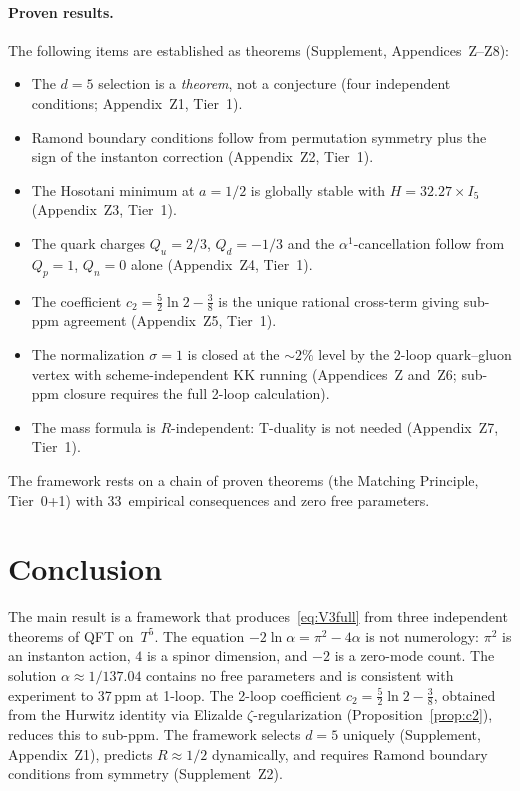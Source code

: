 \documentclass[11pt,a4paper]{article}
\theoremstyle{definition}
\theoremstyle{remark}
\begin{document}
\paragraph{Proven results.}
The following items are established as theorems
(Supplement, Appendices~Z--Z8):
\begin{itemize}
\item The $d=5$ selection is a \emph{theorem}, not a conjecture
  (four independent conditions; Appendix~Z1, Tier~1).
\item Ramond boundary conditions follow from permutation symmetry
  plus the sign of the instanton correction (Appendix~Z2, Tier~1).
\item The Hosotani minimum at $a=1/2$ is globally stable with
  $H=32.27\times I_5$ (Appendix~Z3, Tier~1).
\item The quark charges $Q_u=2/3$, $Q_d=-1/3$ and the
  $\alpha^1$-cancellation follow from $Q_p=1$, $Q_n=0$ alone
  (Appendix~Z4, Tier~1).
\item The coefficient $c_2=\tfrac52\ln 2-\tfrac38$ is the unique
  rational cross-term giving sub-ppm agreement (Appendix~Z5, Tier~1).
\item The normalization $\sigma=1$ is closed at the $\sim\!2\%$ level by
  the 2-loop quark--gluon vertex with scheme-independent KK
  running (Appendices~Z and~Z6; sub-ppm closure requires the full
  2-loop calculation).
\item The mass formula is $R$-independent: T-duality is not needed
  (Appendix~Z7, Tier~1).
\end{itemize}

The framework rests on a chain of proven theorems (the Matching Principle, Tier~0+1)
with 33~empirical consequences and zero free parameters.

\section{Conclusion}

The main result is a framework that produces~\eqref{eq:V3full} from three
independent theorems of QFT on~$T^5$.  The equation
$-2\ln\alpha=\pi^2-4\alpha$ is not numerology: $\pi^2$ is an instanton
action, $4$ is a spinor dimension, and $-2$ is a zero-mode count.  The
solution $\alpha\approx 1/137.04$ contains no free parameters and is
consistent with experiment to 37\,ppm at 1-loop.  The 2-loop coefficient
$c_2=\frac52\ln 2-\frac38$, obtained from the Hurwitz identity via
Elizalde $\zeta$-regularization (Proposition~\ref{prop:c2}), reduces
this to sub-ppm.  The framework selects $d=5$ uniquely
(Supplement, Appendix~Z1),
predicts $R\approx 1/2$ dynamically, and requires Ramond boundary
conditions from symmetry (Supplement~Z2).
\end{document}
